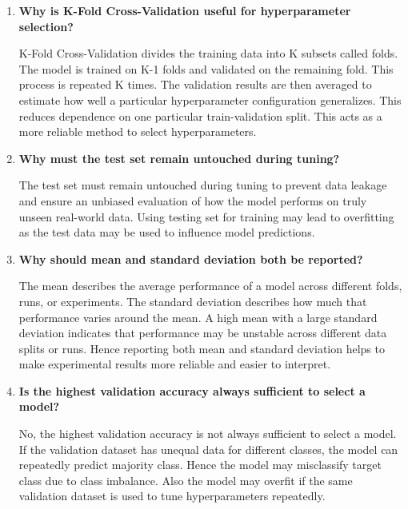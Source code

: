 \documentclass[10pt]{article}
\begin{document}
\begin{enumerate}
\item \textbf{Why is K-Fold Cross-Validation useful for hyperparameter selection?}

\vspace{5mm}
K-Fold Cross-Validation divides the training data into K subsets called folds. The model is trained on K-1 folds and validated on the remaining fold.
This process is repeated K times.
The validation results are then averaged to estimate how well a particular hyperparameter configuration generalizes. 
This reduces dependence on one particular train-validation split. This acts as a more reliable method to select hyperparameters.
\vspace{3mm}

\item \textbf{Why must the test set remain untouched during tuning?}

\vspace{5mm}
The test set must remain untouched during tuning to prevent data leakage and ensure an unbiased evaluation of how the model performs on truly unseen real-world data.
Using testing set for training may lead to overfitting as the test data may be used to influence model predictions.  
\vspace{3mm}


\item \textbf{Why should mean and standard deviation both be reported?}

\vspace{5mm}
The mean describes the average performance of a model across different folds, runs, or experiments. The standard deviation describes how much that performance varies around the mean. 
A high mean with a large standard deviation indicates that performance may be unstable across different data splits or runs. 
Hence reporting both mean and standard deviation helps to make experimental results more reliable and easier to interpret.
\vspace{3mm}

\item \textbf{Is the highest validation accuracy always sufficient to select a model?}

\vspace{5mm}
No, the highest validation accuracy is not always sufficient to select a model. 
If the validation dataset has unequal data for different classes, the model can repeatedly predict majority class. Hence the model may misclassify target class due to class imbalance.
Also the model may overfit if the same validation dataset is used to tune hyperparameters repeatedly.

\vspace{3mm}

\end{enumerate}
\end{document}

